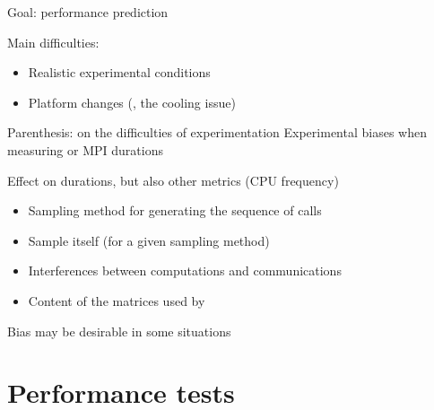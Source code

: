 \documentclass[10pt]{beamer}
\begin{document}
\begin{frame}[plain]
    \begin{LARGE}
        Goal: performance prediction~~~\alert{\textbf{\Huge \checkmark}}
    \end{LARGE}
    \medbreak
    \pause

    Main difficulties:
    \begin{itemize}
        \item Realistic experimental conditions
        \item Platform changes (\eg, the cooling issue)
    \end{itemize}
\end{frame}

\begin{frame}{Parenthesis: on the difficulties of experimentation}
    \alert{Experimental biases} when measuring \dgemm or MPI durations

    Effect on durations, but also other metrics (\eg CPU frequency)
    \onslide<+->
    \begin{itemize}[<+->]
        \item Sampling method for generating the sequence of calls
        \item Sample itself (for a given sampling method)
        \item Interferences between computations and communications
        \item Content of the matrices used by \dgemm
    \end{itemize}

    \onslide<+->
    Bias may be desirable in some situations
\end{frame}


\section{Performance tests}%
\end{document}
